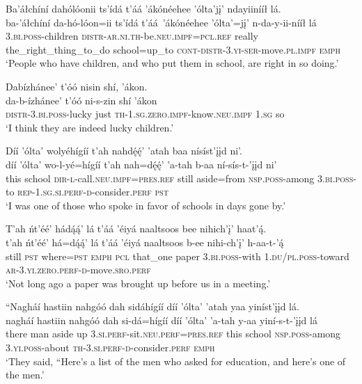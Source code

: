 \ea\label{ex:text3-10-1}
Ba’áłchíní dahólóonii ts’ídá t’áá ’ákónéehee ’ólta’jį’ ndayiinííł lá.\\
\gll ba-’áłchíní	da-hó-lóon=ii	ts’ídá	t’áá~{’ákónéehee}	’ólta’=jį’	n-da-y-ii-nííł	lá\\
     3.\textsc{bi}.\textsc{poss}-children	\textsc{distr}-\textsc{ar}.\textsc{ni}.\textsc{th}-be.\textsc{neu}.\textsc{impf}=\textsc{pcl}.\textsc{ref}	really	the\_right\_thing\_to\_do	school=up\_to	\textsc{cont}-\textsc{distr}-3.\textsc{yi}-\textsc{ser}-move.\textsc{pl}.\textsc{impf}	\textsc{emph}\\
\glt `People who have children, and who put them in school, are right in so doing.'
\z

\ea\label{ex:text3-10-2}
Dabízhánee’ t’óó nisin shí, ’ákon.\\
\gll da-b-ízhánee’	t’óó	ni-s-zin	shí	’ákon\\
     \textsc{distr}-3.\textsc{bi}.\textsc{poss}-lucky	just	\textsc{th}-1.\textsc{sg}.\textsc{zero}.\textsc{impf}-know.\textsc{neu}.\textsc{impf}	1.\textsc{sg}	so\\
\glt `I think they are indeed lucky children.'
\z

\ea\label{ex:text3-10-3}
Díí ’ólta’ wolyéhígíí t’ah nahdę́ę́’ ’atah baa nísíst’įįd ni’.\\
\gll díí	’ólta’	wo-l-yé=hígíí	t’ah	nah=dę́ę́’	’a-tah	b-aa	ní-sís-t-’įįd	ni’\\
     this	school	\textsc{dir}-\textsc{l}-call.\textsc{neu}.\textsc{impf}=\textsc{pres}.\textsc{ref}	still	aside=from	\textsc{nsp}.\textsc{poss}-among	3.\textsc{bi}.\textsc{poss}-to	\textsc{rep}-1.\textsc{sg}.\textsc{si}.\textsc{perf}-\textsc{d}-consider.\textsc{perf}	\textsc{pst}\\
\glt `I was one of those who spoke in favor of schools in days gone by.'
\z

\ea\label{ex:text3-10-4}
T’ah ńt’éé’ hádą́ą́’ lá t’áá ’éiyá naaltsoos bee nihich’į’ haat’ą́.\\
\gll t’ah	ńt’éé’	há=dą́ą́’	lá	t’áá ’éiyá	naaltsoos	b-ee	nihi-ch’į’	h-aa-t-’ą́\\
     still	\textsc{pst}	where=\textsc{pst}	\textsc{emph}	\textsc{pcl} that\_one	paper	3.\textsc{bi}.\textsc{poss}-with	1.\textsc{du}/\textsc{pl}.\textsc{poss}-toward	\textsc{ar}-3.\textsc{yi}.\textsc{zero}.\textsc{perf}-\textsc{d}-move.\textsc{sro}.\textsc{perf}\\
\glt `Not long ago a paper was brought up before us in a meeting.'
\z

\ea\label{ex:text3-10-5}
``Nagháí hastiin nahgóó dah sidáhígíí díí ’ólta’ ’atah yaa yiníst’įįd lá.\\
\gll nagháí	hastiin	nahgóó	dah	si-dá=hígíí	díí	’ólta’	’a-tah	y-aa	yiní-s-t-’įįd	lá\\
     there	man	aside	up	3.\textsc{si}.\textsc{perf}-sit.\textsc{neu}.\textsc{perf}=\textsc{pres}.\textsc{ref}	this	school	\textsc{nsp}.\textsc{poss}-among	3.\textsc{yi}.\textsc{poss}-about	\textsc{th}-3.\textsc{si}.\textsc{perf}-\textsc{d}-consider.\textsc{perf}	\textsc{emph}\\
\glt `They said, ``Here's a list of the men who asked for education, and here's one of the men.'
\z

